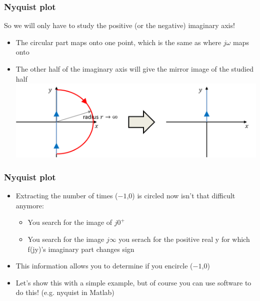 \begin{frame}
\frametitle{Nyquist plot}
So we will only have to study the positive (or the negative) imaginary axis!
\\ \begin{itemize}
\item The circular part maps onto one point, which is the same as where $j\omega$ maps onto
\item The other half of the imaginary axis will give the mirror image of the studied half
\\ \includegraphics[width=0.9\linewidth]{Afbeelding12}
\end{itemize}
\end{frame}

\begin{frame}
\frametitle{Nyquist plot}
\begin{itemize}
\item Extracting the number of times ($-1$,$0$) is circled now isn't that difficult anymore:
\\ \begin{itemize}
\item You search for the image of $j0^+$
\item You search for the image $j\infty$
\then you serach for the positive real y for which f(jy)'s imaginary part changes sign
\end{itemize}
\item This information allows you to determine if you encircle ($-1$,$0$)
\item Let’s show this with a simple example, but of course you can use software to do this! (e.g. nyquist in Matlab)
\end{itemize}
\end{frame}

